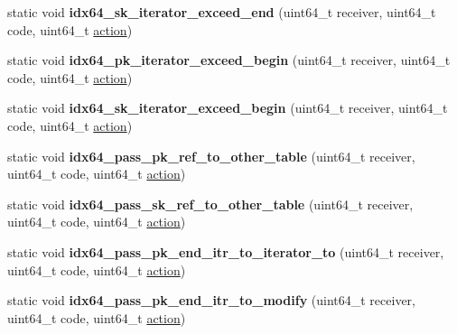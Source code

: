 \begin{DoxyCompactItemize}
\mbox{\label{structtest__multi__index_a876a403733baa6822437921ac426c51c}} 
static void {\bfseries idx64\+\_\+sk\+\_\+iterator\+\_\+exceed\+\_\+end} (uint64\+\_\+t receiver, uint64\+\_\+t code, uint64\+\_\+t \mbox{\hyperlink{structaacio_1_1action}{action}})
\item 
\mbox{\label{structtest__multi__index_a22bc288ebd362daa8e17a31fa78a3792}} 
static void {\bfseries idx64\+\_\+pk\+\_\+iterator\+\_\+exceed\+\_\+begin} (uint64\+\_\+t receiver, uint64\+\_\+t code, uint64\+\_\+t \mbox{\hyperlink{structaacio_1_1action}{action}})
\item 
\mbox{\label{structtest__multi__index_a6c0739f99c7fb8dd95c88a9d68e6a8da}} 
static void {\bfseries idx64\+\_\+sk\+\_\+iterator\+\_\+exceed\+\_\+begin} (uint64\+\_\+t receiver, uint64\+\_\+t code, uint64\+\_\+t \mbox{\hyperlink{structaacio_1_1action}{action}})
\item 
\mbox{\label{structtest__multi__index_a1ded82f95069040d0ba6a5097fc70d53}} 
static void {\bfseries idx64\+\_\+pass\+\_\+pk\+\_\+ref\+\_\+to\+\_\+other\+\_\+table} (uint64\+\_\+t receiver, uint64\+\_\+t code, uint64\+\_\+t \mbox{\hyperlink{structaacio_1_1action}{action}})
\item 
\mbox{\label{structtest__multi__index_ac54320fcbfb81b8a97f63c0d4ce1d6b2}} 
static void {\bfseries idx64\+\_\+pass\+\_\+sk\+\_\+ref\+\_\+to\+\_\+other\+\_\+table} (uint64\+\_\+t receiver, uint64\+\_\+t code, uint64\+\_\+t \mbox{\hyperlink{structaacio_1_1action}{action}})
\item 
\mbox{\label{structtest__multi__index_a19590650079784ecda9105fc99085005}} 
static void {\bfseries idx64\+\_\+pass\+\_\+pk\+\_\+end\+\_\+itr\+\_\+to\+\_\+iterator\+\_\+to} (uint64\+\_\+t receiver, uint64\+\_\+t code, uint64\+\_\+t \mbox{\hyperlink{structaacio_1_1action}{action}})
\item 
\mbox{\label{structtest__multi__index_a2c63015643cb9bec03c512bc893f652d}} 
static void {\bfseries idx64\+\_\+pass\+\_\+pk\+\_\+end\+\_\+itr\+\_\+to\+\_\+modify} (uint64\+\_\+t receiver, uint64\+\_\+t code, uint64\+\_\+t \mbox{\hyperlink{structaacio_1_1action}{action}})

\end{DoxyCompactItemize}
